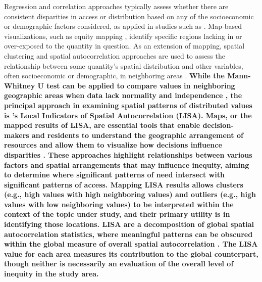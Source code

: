 \documentclass[final,3p,times,onecolumn,sort&compress]{elsarticle}
\begin{document}
Regression and correlation approaches typically assess whether there are consistent disparities in access or distribution based on any of the socioeconomic or demographic factors considered, as applied in studies such as \cite{Schwarz2015-fs, Nesbitt2019-sk, Kim2016-mc, Williams2020-greenspace, Apparicio2007-di}.
Map-based visualizations, such as equity mapping \citep{Talen1998-fl, Wolch2005-wz}, identify specific regions lacking in or over-exposed to the quantity in question.
As an extension of mapping, spatial clustering and spatial autocorrelation approaches are used to assess the relationship between some quantity’s spatial distribution and other variables, often socioeconomic or demographic, in neighboring areas \citep{Talen1997-gl, Smoyer-Tomic2004-eh,Garcia2020-xt}.
\textbf{While the Mann-Whitney U test can be applied to compare values in neighboring geographic areas when data lack normality and independence \citep{Nicholls2001-pf}, the principal approach in examining spatial patterns of distributed values is \cite{Anselin1995-fh}'s Local Indicators of Spatial Autocorrelation (LISA). 
Maps, or the mapped results of LISA, are essential tools that enable decision-makers and residents to understand the geographic arrangement of resources and allow them to visualize how decisions influence disparities \citep{Talen1998-fl}.
These approaches highlight relationships between various factors and spatial arrangements that may influence inequity, aiming to determine where significant patterns of need intersect with significant patterns of access. 
Mapping LISA results allows clusters (e.g., high values with high neighboring values) and outliers (e.g., high values with low neighboring values) to be interpreted within the context of the topic under study, and their primary utility is in identifying those locations. 
LISA are a decomposition of global spatial autocorrelation statistics, where meaningful patterns can be obscured within the global measure of overall spatial autocorrelation \citep{Talen1998-mk}. 
The LISA value for each area measures its contribution to the global counterpart, though neither is necessarily an evaluation of the overall level of inequity in the study area.
}
\end{document}
